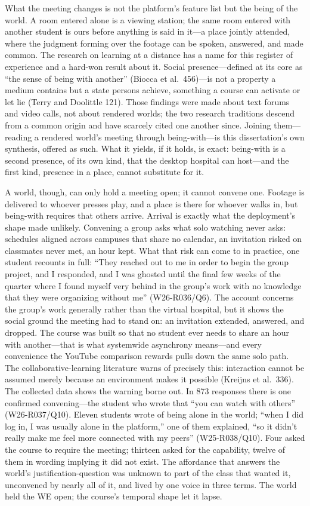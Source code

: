 What the meeting changes is not the platform's feature list but the
being of the world. A room entered alone is a viewing station; the
same room entered with another student is ours before anything is said
in it---a place jointly attended, where the judgment forming over the
footage can be spoken, answered, and made common. The research on
learning at a distance has a name for this register of experience and
a hard-won result about it. Social presence---defined at its core as
``the sense of being with another'' (Biocca et al.\ 456)---is not a
property a medium contains but a state persons achieve, something a
course can activate or let lie (Terry and Doolittle 121). Those
findings were made about text forums and video calls, not about
rendered worlds; the two research traditions descend from a common
origin and have scarcely cited one another since. Joining
them---reading a rendered world's meeting through being-with---is this
dissertation's own synthesis, offered as such. What it yields, if it
holds, is exact: being-with is a second presence, of its own kind,
that the desktop hospital can host---and the first kind, presence in a
place, cannot substitute for it.

A world, though, can only hold a meeting open; it cannot convene one.
Footage is delivered to whoever presses play, and a place is there for
whoever walks in, but being-with requires that others arrive. Arrival
is exactly what the deployment's shape made unlikely. Convening a
group asks what solo watching never asks: schedules aligned across
campuses that share no calendar, an invitation risked on classmates
never met, an hour kept. What that risk can come to in practice, one
student recounts in full: ``They reached out to me in order to begin the
group project, and I responded, and I was ghosted until the final few
weeks of the quarter where I found myself very behind in the group's work
with no knowledge that they were organizing without me'' (W26-R036/Q6).
The account concerns the group's work generally rather than the virtual
hospital, but it shows the social ground the meeting had to stand on: an
invitation extended, answered, and dropped. The course was built so that no student ever
needs to share an hour with another---that is what systemwide
asynchrony means---and every convenience the YouTube comparison
rewards pulls down the same solo path. The collaborative-learning
literature warns of precisely this: interaction cannot be assumed
merely because an environment makes it possible (Kreijns et al.\ 336).
The collected data shows the warning borne out. In 873 responses there
is one confirmed convening---the student who wrote that ``you can
watch with others'' (W26-R037/Q10). Eleven students wrote of being
alone in the world; ``when I did log in, I was usually alone in the
platform,'' one of them explained, ``so it didn't really make me feel
more connected with my peers'' (W25-R038/Q10). Four asked the course
to require the meeting; thirteen asked for the capability, twelve of
them in wording implying it did not exist. The affordance that answers
the world's justification-question was unknown to part of the class
that wanted it, unconvened by nearly all of it, and lived by one voice
in three terms. The world held the WE open; the course's temporal
shape let it lapse.


